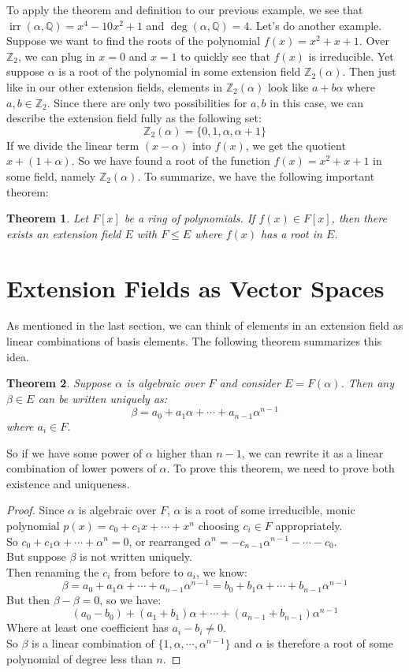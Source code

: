 \documentclass[11pt]{amsart}
\newtheorem{theorem}{Theorem}[section]
\theoremstyle{definition}
\newcommand{\rationals}{\mathbb{Q}}
\newcommand{\integers}{\mathbb{Z}}
\DeclareMathOperator{\irr}{irr}
\begin{document}
To apply the theorem and definition to our previous example, we see that $\irr(\alpha, \rationals) = x^4 - 10x^2 + 1$ and 
$\deg(\alpha, \rationals) = 4$. Let's do another example. Suppose we want to find the roots of the polynomial $f(x) = x^2 + x + 1$. Over 
$\integers_2$, we can plug in $x = 0$ and $x = 1$ to quickly see that $f(x)$ is irreducible. Yet suppose $\alpha$ is a root of the polynomial
in some extension field $\integers_2(\alpha)$. Then just like in our other extension fields, elements in $\integers_2(\alpha)$ look like
$a + b\alpha$ where $a, b \in \integers_2$. Since there are only two possibilities for $a, b$ in this case, we can describe the extension field
fully as the following set:
\[
	\integers_2(\alpha) = \{ 0, 1, \alpha, \alpha + 1 \}
\]
If we divide the linear term $(x - \alpha)$ into $f(x)$, we get the quotient $x + (1 + \alpha)$. So we have found a root of the function
$f(x) = x^2 + x + 1$ in some field, namely $\integers_2(\alpha)$. To summarize, we have the following important theorem:
\begin{theorem}
	Let $F[x]$ be a ring of polynomials. If $f(x) \in F[x]$, then there exists an extension field $E$ with $F \leq E$ where $f(x)$ has a root in $E$.
\end{theorem}

\newpage
\section{Extension Fields as Vector Spaces}
As mentioned in the last section, we can think of elements in an extension field as linear combinations of basis elements. The following theorem
summarizes this idea.
\begin{theorem}
	Suppose $\alpha$ is algebraic over $F$ and consider $E = F(\alpha)$. Then any $\beta \in E$ can be written uniquely as:
	\[
		\beta = a_0 + a_1\alpha + \cdots + a_{n-1}\alpha^{n-1}
	\]
	where $a_i \in F$.
\end{theorem}
So if we have some power of $\alpha$ higher than $n - 1$, we can rewrite it as a linear combination of lower powers of $\alpha$. To prove this
theorem, we need to prove both existence and uniqueness.
\begin{proof}
	Since $\alpha$ is algebraic over $F$, $\alpha$ is a root of some irreducible, monic polynomial $p(x) = c_0 + c_1x + \cdots + x^n$
	choosing $c_i \in F$ appropriately. \\
	So $c_0 + c_1\alpha + \cdots + \alpha^n = 0$, or rearranged $\alpha^n = -c_{n-1}\alpha^{n-1} - \cdots - c_0$. \\
	But suppose $\beta$ is not written uniquely. \\
	Then renaming the $c_i$ from before to $a_i$, we know:
	\[
		\beta = a_0 + a_1\alpha + \cdots + a_{n-1}\alpha^{n-1} = b_0 + b_1\alpha + \cdots + b_{n-1}\alpha^{n-1}
	\]
	But then $\beta - \beta = 0$, so we have:
	\[
		(a_0 - b_0) + (a_1 + b_1)\alpha + \cdots + (a_{n-1} + b_{n-1})\alpha^{n-1}
	\]
	Where at least one coefficient has $a_i - b_i \neq 0$. \\
	So $\beta$ is a linear combination of $\{ 1, \alpha, \cdots, \alpha^{n-1} \}$ and $\alpha$ is therefore a root of some polynomial of
	degree less than $n$.
\end{proof}
\end{document}
